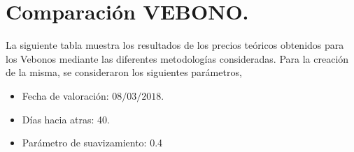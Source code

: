 \newpage

\section{Comparaci\'on VEBONO.}


\hspace{0.4cm}La siguiente tabla muestra los resultados de los precios te\'oricos obtenidos para los Vebonos mediante las diferentes metodolog\'ias consideradas. Para la creaci\'on de la misma, se consideraron los siguientes par\'ametros,

\begin{itemize}
  \item Fecha de valoraci\'on: $08/03/2018$.
  \item D\'ias hacia atras: 40.
  \item Par\'ametro de suavizamiento: 0.4
\end{itemize}

